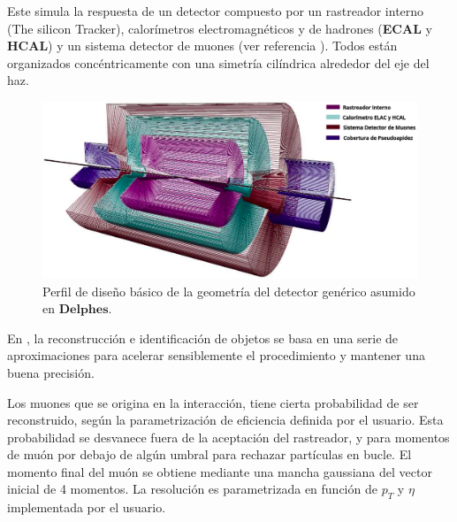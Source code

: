 Este simula la respuesta de un detector compuesto por un rastreador interno (The silicon Tracker), calorímetros electromagnéticos y de hadrones (\textbf{ECAL} y \textbf{HCAL}) y un sistema detector de muones (ver referencia \cite{de_favereau_Delphes_2014}). Todos están organizados concéntricamente con una simetría cilíndrica alrededor del eje del haz. %

\begin{figure}[!t]
    \centering
    \includegraphics[width=.95\textwidth]{Cap2/imagenes/delphes.png}
    \caption[Perfil de diseño básico de la geometría del detector genérico asumido en  .]{Perfil de diseño básico de la geometría del detector genérico asumido en  $\mathbf{Delphes}$.\footnotemark}
    \label{Delphes}
\end{figure}


En , la reconstrucción e identificación de objetos se basa en una serie de aproximaciones para acelerar sensiblemente el procedimiento y mantener una buena precisión. 

Los muones que se origina en la interacción, tiene cierta probabilidad de ser reconstruido, según la parametrización de eficiencia definida por el usuario. Esta probabilidad se desvanece fuera de la aceptación del rastreador, y para momentos de muón por debajo de algún umbral para rechazar partículas en bucle. El momento final del muón se obtiene mediante una mancha gaussiana del vector inicial de 4 momentos. La resolución es parametrizada en función de $p_T$ y $\eta$ implementada por el usuario.

